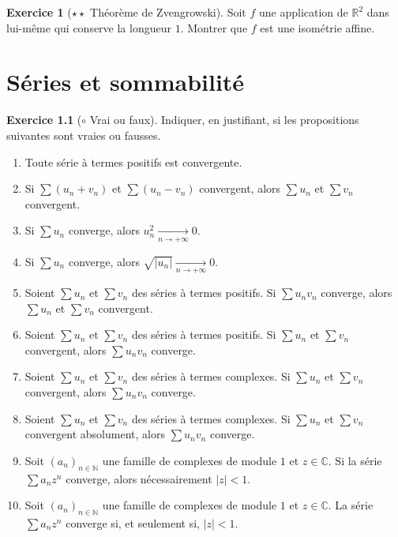 \documentclass[french]{book}
\newcommand{\N}{\mathbb{N}}
\newcommand{\R}{\mathbb{R}}
\newcommand{\C}{\mathbb{C}}
\theoremstyle{definition}
\newtheorem{ex}{Exercice}[chapter]
\theoremstyle{theorem}
\theoremstyle{remark}
\begin{document}
\begin{ex}[$\star\star$ Théorème de Zvengrowski]
	Soit $f$ une application de $\R^2$ dans lui-même qui conserve la longueur $1$. Montrer que $f$ est une isométrie affine.
\end{ex}

\chapter{Séries et sommabilité}

\begin{ex}[$\circ$ Vrai ou faux]
	Indiquer, en justifiant, si les propositions suivantes sont vraies ou fausses.
	\begin{enumerate}[label=\roman*)]
		\item Toute série à termes positifs est convergente.
		\item Si $\displaystyle\sum (u_n+v_n)$ et $\displaystyle\sum(u_n-v_n)$ convergent, alors $\displaystyle\sum u_n$ et $\displaystyle\sum v_n$ convergent.
		\item Si $\displaystyle\sum u_n$ converge, alors $\displaystyle u_n^2\xrightarrow[n\to+\infty]{}0$.
		\item Si $\displaystyle\sum u_n$ converge, alors $\displaystyle \sqrt{\lvert u_n\rvert}\xrightarrow[n\to+\infty]{}0$.
		\item Soient $\displaystyle\sum u_n$ et $\displaystyle\sum v_n$ des séries à termes positifs. Si $\displaystyle\sum u_n v_n$ converge, alors $\displaystyle\sum u_n$ et $\displaystyle\sum v_n$ convergent. 
		\item Soient $\displaystyle\sum u_n$ et $\displaystyle\sum v_n$ des séries à termes positifs. Si $\displaystyle\sum u_n$ et $\displaystyle\sum v_n$ convergent, alors $\displaystyle\sum u_nv_n$ converge.
		\item Soient $\displaystyle\sum u_n$ et $\displaystyle\sum v_n$ des séries à termes complexes. Si $\displaystyle\sum u_n$ et $\displaystyle\sum v_n$ convergent, alors $\displaystyle\sum u_nv_n$ converge.
		\item Soient $\displaystyle\sum u_n$ et $\displaystyle\sum v_n$ des séries à termes complexes. Si $\displaystyle\sum u_n$ et $\displaystyle\sum v_n$ convergent absolument, alors $\displaystyle\sum u_nv_n$ converge.
		\item Soit $(a_n)_{n\in\N}$ une famille de complexes de module $1$ et $z\in\C$. Si la série $\displaystyle\sum a_nz^n$ converge, alors nécessairement $\lvert z\rvert<1$.
		\item Soit $(a_n)_{n\in\N}$ une famille de complexes de module $1$ et $z\in\C$. La série $\displaystyle\sum a_nz^n$ converge si, et seulement si, $\lvert z\rvert<1$.
	\end{enumerate}
\end{ex}
\end{document}
